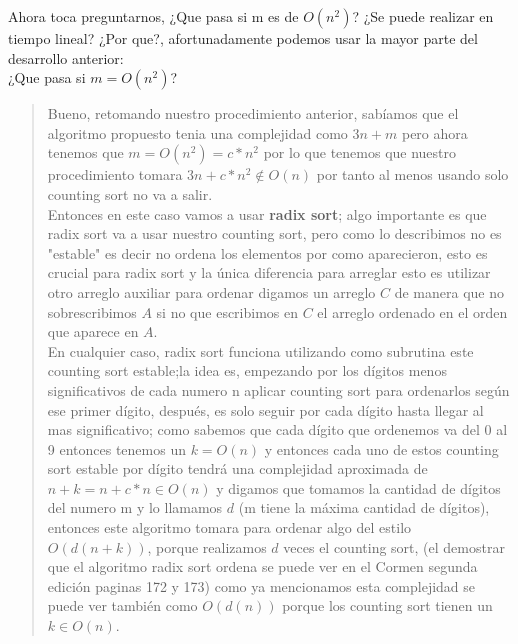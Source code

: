 Ahora toca preguntarnos, ¿Que pasa si m es de $O(n^2)$? ¿Se puede realizar en tiempo lineal? ¿Por que?, afortunadamente podemos usar la mayor parte del desarrollo anterior:\\

\textcolor{bibi}{¿Que pasa si $m = O(n^2)$?}
\begin{quote}
    Bueno, retomando nuestro procedimiento anterior, sabíamos que el algoritmo propuesto tenia una complejidad como $3n+m$ pero ahora tenemos que $m = O(n^2) = c * n^2$ por lo que tenemos que nuestro procedimiento tomara $3n+c*n^2 \not \in O(n)$ por tanto al menos usando solo counting sort no va a salir.\\

    Entonces en este caso vamos a usar \textbf{radix sort}; algo importante es que radix sort va a usar nuestro counting sort, pero como lo describimos no es "estable" es decir no ordena los elementos por como aparecieron, esto es crucial para radix sort y la única diferencia para arreglar esto es utilizar otro arreglo auxiliar para ordenar digamos un arreglo $C$ de manera que no sobrescribimos $A$ si no que escribimos en $C$ el arreglo ordenado en el orden que aparece en $A$.\\

    En cualquier caso, radix sort funciona utilizando como subrutina este counting sort estable;la idea es, empezando por los dígitos menos significativos de cada numero n aplicar counting sort para ordenarlos según ese primer dígito, después, es solo seguir por cada dígito hasta llegar al mas significativo; como sabemos que cada dígito que ordenemos va del 0 al 9 entonces tenemos un $k=O(n)$ y entonces cada uno de estos counting sort estable por dígito tendrá una complejidad aproximada de $n+k=n+c*n \in O(n)$ y digamos que tomamos la cantidad de dígitos del numero m y lo llamamos $d$ (m tiene la máxima cantidad de dígitos), entonces este algoritmo tomara para ordenar algo del estilo $O(d(n+k))$, porque realizamos $d$ veces el counting sort, (el demostrar que el algoritmo radix sort ordena se puede ver en el Cormen segunda edición paginas 172 y 173) como ya mencionamos esta complejidad se puede ver también como $O(d(n))$ porque los counting sort tienen un $k \in O(n)$.\\


\end{quote}

